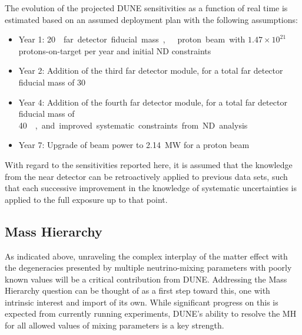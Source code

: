 The evolution of the projected DUNE sensitivities as a function of real time is estimated based on an assumed deployment plan
with the following assumptions:
%
\begin{itemize}
\item Year 1: \SI{20}\kt{} far detector fiducial mass,  
  proton beam with $1.47 \times 10^{21}$ protons-on-target per year 
  and initial ND constraints
\item Year 2: Addition of the third  far detector module, for a total far detector fiducial mass of
  \SI{30}\kt
\item Year 4: Addition of the fourth  far detector module, for a total far detector fiducial mass of
  \SI{40}\kt, and improved systematic constraints from ND analysis
 \item Year 7: Upgrade of beam power to \SI{2.14}{\MW} for a 
  proton beam
\end{itemize}
With regard to the sensitivities reported here, it is assumed that the knowledge from the near detector can be
retroactively applied to previous data sets, such that each
successive improvement in the knowledge of systematic uncertainties
is applied to the full exposure
up to that point.

\subsection{Mass Hierarchy}
\label{sec:exec-summ-physics-mh-cpv}

As indicated above, unraveling the complex interplay of the matter effect with the degeneracies presented by multiple neutrino-mixing parameters with poorly known values will be a critical contribution from DUNE. Addressing the Mass Hierarchy question can be thought of as a first step toward this, one with intrinsic interest and import of its own.  While significant progress on this is expected from currently running experiments, DUNE's ability to resolve the MH for all allowed values of mixing parameters is a key strength.

